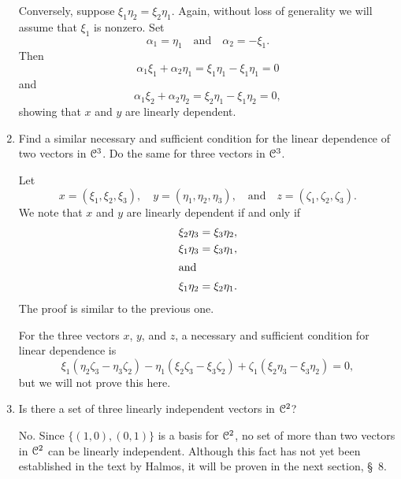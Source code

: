 \begin{enumerate}
\begin{solution}
    Conversely, suppose $\xi_1\eta_2 = \xi_2\eta_1$. Again, without
    loss of generality we will assume that $\xi_1$ is nonzero. Set
    \begin{equation*}
      \alpha_1 = \eta_1
      \quad\text{and}\quad
      \alpha_2 = -\xi_1.
    \end{equation*}
    Then
    \begin{equation*}
      \alpha_1\xi_1 + \alpha_2\eta_1 = \xi_1\eta_1 - \xi_1\eta_1 = 0
    \end{equation*}
    and
    \begin{equation*}
      \alpha_1\xi_2 + \alpha_2\eta_2 = \xi_2\eta_1 - \xi_1\eta_2 = 0,
    \end{equation*}
    showing that $x$ and $y$ are linearly dependent.
  \end{solution}
\item Find a similar necessary and sufficient condition for the linear
  dependence of two vectors in $\mathcal{C}^3$. Do the same for three vectors
  in $\mathcal{C}^3$.
  \begin{solution}
    Let
    \begin{equation*}
      x = (\xi_1, \xi_2, \xi_3),
      \quad
      y = (\eta_1, \eta_2, \eta_3),
      \quad\text{and}\quad
      z = (\zeta_1, \zeta_2, \zeta_3).
    \end{equation*}
    We note that $x$ and $y$ are linearly dependent if and only if
    \begin{align*}
      \xi_2\eta_3 &= \xi_3\eta_2, \\
      \xi_1\eta_3 &= \xi_3\eta_1, \\
      \intertext{and}
      \xi_1\eta_2 &= \xi_2\eta_1.
    \end{align*}
    The proof is similar to the previous one.

    For the three vectors $x$, $y$, and $z$, a necessary and
    sufficient condition for linear dependence is
    \begin{equation*}
      \xi_1(\eta_2\zeta_3 - \eta_3\zeta_2)
      - \eta_1(\xi_2\zeta_3 - \xi_3\zeta_2)
      + \zeta_1(\xi_2\eta_3 - \xi_3\eta_2) = 0,
    \end{equation*}
    but we will not prove this here.
  \end{solution}
\item Is there a set of three linearly independent vectors in $\mathcal{C}^2$?
  \begin{solution}
    No. Since $\{(1,0), (0,1)\}$ is a basis for $\mathcal{C}^2$, no set of more
    than two vectors in $\mathcal{C}^2$ can be linearly independent. Although
    this fact has not yet been established in the text by Halmos, it
    will be proven in the next section, \S\ 8.
  \end{solution}
\end{enumerate}

